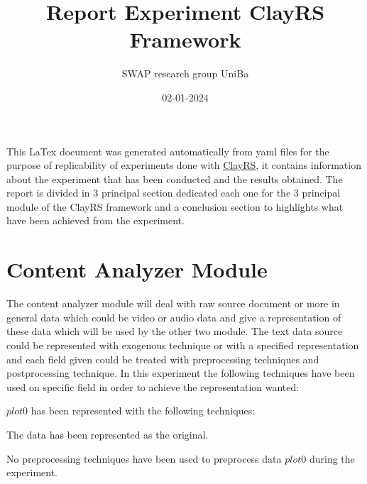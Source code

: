 \documentclass[11pt]{article}
\title{Report Experiment ClayRS Framework}
\author{SWAP research group UniBa}
\date{02-01-2024}
\begin{document}
\maketitle
This LaTex document was generated automatically from yaml files for the purpose of replicability of experiments done with
\href{https://github.com/swapUniba/ClayRS}{ClayRS},
it contains information about the experiment that has been conducted and the results obtained.
The report is divided in 3 principal section dedicated each one for the 3 principal module of the ClayRS framework
and a conclusion section to highlights what have been achieved from the experiment.
\hfill\break
\hfill\break



\section{Content Analyzer Module}\label{sec:ca}
The content analyzer module will deal with raw source document or more in general data which could be
video or audio data and give a representation of these data which will be used by the other two module.
The text data source could be represented with exogenous technique or with a specified representation
and each field given could be treated with preprocessing techniques and postprocessing technique.
In this experiment the following techniques have been used on specific field in order to achieve the
representation wanted:
\hfill\break
\hfill\break



$ plot0 $  has been represented with the following techniques:
\hfill\break
\hfill\break



The data has been represented as the original.
\hfill\break
\hfill\break



No preprocessing techniques have been used to preprocess data $ plot0 $ during the experiment.
\hfill\break
\hfill\break
{}
\end{document}

